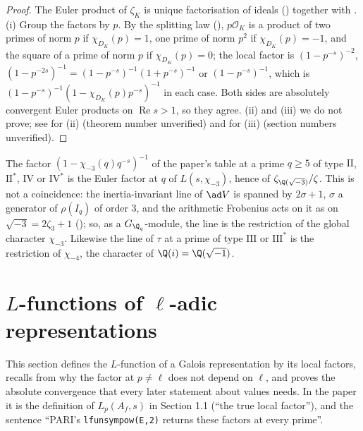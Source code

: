 \begin{proof}
The Euler product of $\zeta_K$ is unique factorisation of ideals () together with . (i) Group the factors by
$p$. By the splitting law (), $p\mathcal O_K$ is a product of two primes of norm $p$ if $\chi_{D_K}(p)=1$, one prime of norm $p^2$ if $\chi_{D_K}(p)=-1$, and
the square of a prime of norm $p$ if $\chi_{D_K}(p)=0$; the local factor is $(1-p^{-s})^{-2}$, $(1-p^{-2s})^{-1}=(1-p^{-s})^{-1}(1+p^{-s})^{-1}$ or $(1-p^{-s})^{-1}$, which is
$(1-p^{-s})^{-1}(1-\chi_{D_K}(p)p^{-s})^{-1}$ in each case. Both sides are absolutely convergent Euler products on $\operatorname{Re}s>1$, so they agree. (ii) and (iii) we do not
prove; see \cite[Theorem 4.3]{Washington} for (ii) (theorem number unverified) and \cite[Chapter VII, Sections 5 and 10]{Neukirch} for (iii) (section numbers
unverified).
\end{proof}

\begin{remark}\label{rem:lfunctions:characters-in-table}
The factor $(1-\chi_{-3}(q)q^{-s})^{-1}$ of the paper's table at a prime $q\ge5$ of type $\mathrm{II}$, $\mathrm{II}^*$, $\mathrm{IV}$ or $\mathrm{IV}^*$ is the Euler factor at $q$ of $L(s,\chi_{-3})$,
hence of $\zeta_{\Q(\sqrt{-3})}/\zeta$. This is not a coincidence: the inertia-invariant line of $\ad V$ is spanned by $2\sigma+1$, $\sigma$ a generator of $\rho(I_q)$ of order
$3$, and the arithmetic Frobenius acts on it as on $\sqrt{-3}=2\zeta_3+1$ (); so, as a $G_{\Q_q}$-module, the line is the restriction of the
global character $\chi_{-3}$. Likewise the line of $\tau$ at a prime of type $\mathrm{III}$ or $\mathrm{III}^*$ is the restriction of $\chi_{-4}$, the character of
$\Q(i)=\Q(\sqrt{-1})$.
\end{remark}

\section{\texorpdfstring{$L$}{L}-functions of \texorpdfstring{$\ell$}{l}-adic representations}\label{sec:lfunctions:galois}

This section defines the $L$-function of a Galois representation by its local factors, recalls from  why the factor at $p\ne\ell$ does not
depend on $\ell$, and proves the absolute convergence that every later statement about values needs. In the paper it is the definition of
$L_p(A_f,s)$ in Section 1.1 (``the true local factor''), and the sentence ``PARI's \texttt{lfunsympow(E,2)} returns these factors at every prime''.

